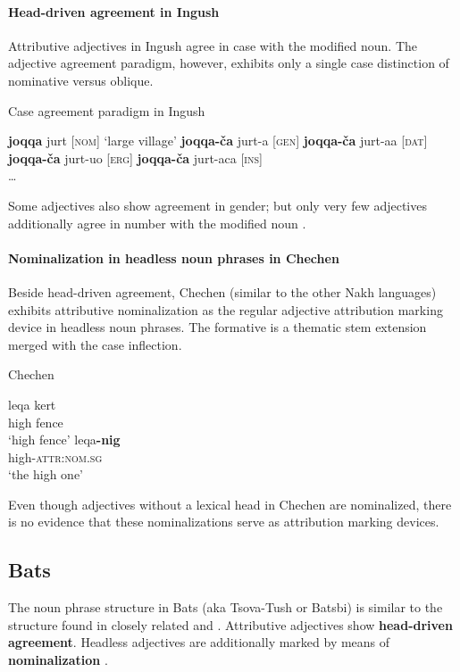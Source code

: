 \paragraph{Head-driven agreement in Ingush}
Attributive adjectives in Ingush agree in case with the modified noun. The adjective agreement paradigm, however, exhibits only a single case distinction of nominative versus oblique.
\begin{exe}
\label{ingush agr}
\ex \rm{Case agreement paradigm in Ingush \citep[99]{nichols1994b}}
\begin{xlist}
\ex \textbf{joqqa} jurt		\rm{[\textsc{nom}] ‘large village’}
\ex \textbf{joqqa-ča} jurt-a	\rm{[\textsc{gen}]}
\ex \textbf{joqqa-ča} jurt-aa	\rm{[\textsc{dat}]}
\ex \textbf{joqqa-ča} jurt-uo	\rm{[\textsc{erg}]}
\ex \textbf{joqqa-ča} jurt-aca	\rm{[\textsc{ins}]}\\
\dots
\end{xlist}
\end{exe}
Some adjectives also show agreement in gender; but only very few adjectives additionally agree in number with the modified noun \citep[99]{nichols1994b}.

\paragraph{Nominalization in headless noun phrases in Chechen}
Beside head-driven agreement, Chechen (similar to the other Nakh languages) exhibits attributive nominalization as the regular adjective attribution marking device in headless noun phrases. The formative is a thematic stem extension merged with the case inflection.
\begin{exe}
\ex \rm{Chechen \citep[29]{nichols1994a}}
\begin{xlist}
\ex
\gll	leqa kert\\
	high fence\\
\glt	‘high fence’
\ex	
\gll	leqa\textbf{-nig}\\
	high-\textsc{attr:nom.sg}\\
\glt	‘the high one’
\end{xlist}
\end{exe}
Even though adjectives without a lexical head in Chechen are nominalized, there is no evidence that these nominalizations serve as attribution marking devices.

\subsection{Bats}
The noun phrase structure in Bats (aka Tsova-Tush or Batsbi) is similar to the structure found in closely related  and . Attributive adjectives show \textbf{head-driven agreement}. Headless adjectives are additionally marked by means of \textbf{nominalization} \cite[172–172]{holisky-etal1994}.


